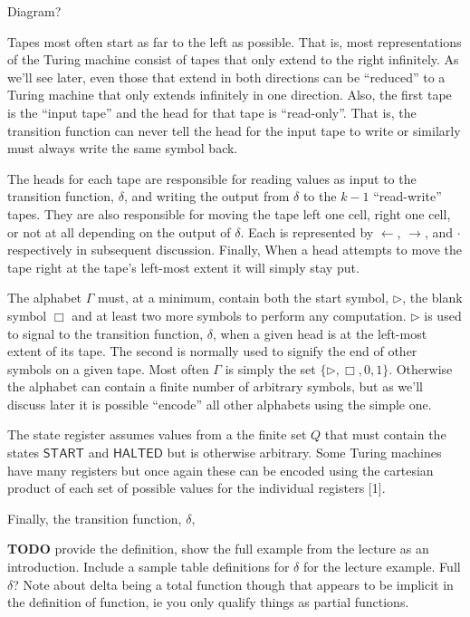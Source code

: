 \documentclass[usletter]{article}
\begin{document}
Diagram?

Tapes most often start as far to the left as possible. That is, most representations of the Turing machine consist of tapes that only extend to the right infinitely. As we'll see later, even those that extend in both directions can be ``reduced'' to a Turing machine that only extends infinitely in one direction. Also, the first tape is the ``input tape'' and the head for that tape is ``read-only''. That is, the transition function can never tell the head for the input tape to write or similarly must always write the same symbol back.

The heads for each tape are responsible for reading values as input to the transition function, $\delta$, and writing the output from $\delta$ to the $k-1$ ``read-write'' tapes. They are also responsible for moving the tape left one cell, right one cell, or not at all depending on the output of $\delta$. Each is represented by $\leftarrow$, $\rightarrow$, and $\cdot$ respectively in subsequent discussion. Finally, When a head attempts to move the tape right at the tape's left-most extent it will simply stay put.

The alphabet $\Gamma$ must, at a minimum, contain both the start symbol, $\rhd$, the blank symbol $\Box$ and at least two more symbols to perform any computation. $\rhd$ is used to signal to the transition function, $\delta$, when a given head is at the left-most extent of its tape. The second is normally used to signify the end of other symbols on a given tape. Most often $\Gamma$ is simply the set $\{\rhd, \Box, 0, 1\}$. Otherwise the alphabet can contain a finite number of arbitrary symbols, but as we'll discuss later it is possible ``encode'' all other alphabets using the simple one.

The state register assumes values from a the finite set $Q$ that must contain the states $\textsf{START}$ and $\textsf{HALTED}$ but is otherwise arbitrary. Some Turing machines have many registers but once again these can be encoded using the cartesian product of each set of possible values for the individual registers [1].

Finally, the transition function, $\delta$,

\textbf{TODO} provide the definition, show the full example from the lecture as an introduction. Include a sample table definitions for $\delta$ for the lecture example. Full $\delta$? Note about delta being a total function though that appears to be implicit in the definition of function, ie you only qualify things as partial functions.
\end{document}
